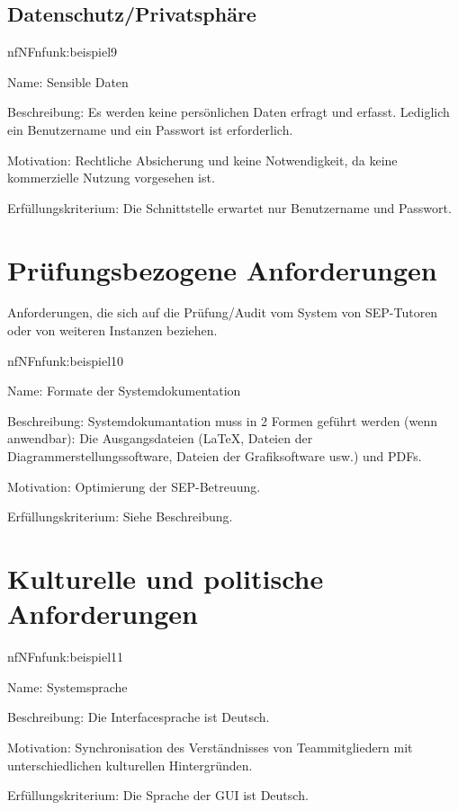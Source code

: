 \subsection{Datenschutz/Privatsphäre}

\begin{description}[leftmargin=5em, style=sameline]	
	\begin{lhp}{nf}{NF}{nfunk:beispiel9}
		\item [Name:] Sensible Daten
		\item [Beschreibung:] Es werden keine persönlichen Daten erfragt und erfasst. Lediglich ein Benutzername und ein Passwort ist erforderlich.
		\item [Motivation:] Rechtliche Absicherung und keine Notwendigkeit, da keine kommerzielle Nutzung vorgesehen ist.
		\item [Erfüllungskriterium:] Die Schnittstelle erwartet nur Benutzername und Passwort.
	\end{lhp}
\end{description}


\section{Prüfungsbezogene Anforderungen}

Anforderungen, die sich auf die Prüfung/Audit vom System von SEP-Tutoren oder von weiteren Instanzen beziehen.


\begin{description}[leftmargin=5em, style=sameline]	
	\begin{lhp}{nf}{NF}{nfunk:beispiel10}
		\item [Name:] Formate der Systemdokumentation
		\item [Beschreibung:] Systemdokumantation muss in 2 Formen geführt werden (wenn anwendbar): Die Ausgangsdateien (\LaTeX, Dateien der Diagrammerstellungssoftware, Dateien der Grafiksoftware usw.) und PDFs.
		\item [Motivation:] Optimierung der SEP-Betreuung.
		\item [Erfüllungskriterium:] Siehe Beschreibung.
	\end{lhp}
\end{description}

\section{Kulturelle und politische Anforderungen}


\begin{description}[leftmargin=5em, style=sameline]	
	\begin{lhp}{nf}{NF}{nfunk:beispiel11}
		\item [Name:] Systemsprache
		\item [Beschreibung:] Die Interfacesprache ist Deutsch.
		\item [Motivation:] Synchronisation des Verständnisses von Teammitgliedern mit unterschiedlichen kulturellen Hintergründen.
		\item [Erfüllungskriterium:] Die Sprache der GUI ist Deutsch.
	\end{lhp}
\end{description}


